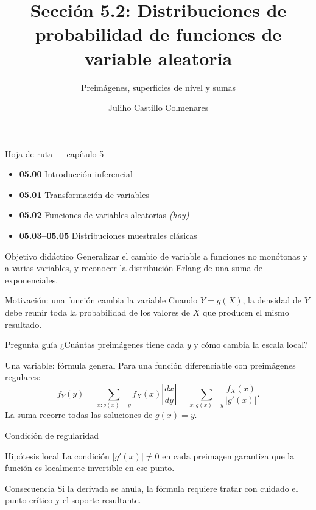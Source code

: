 \documentclass[10pt,aspectratio=169]{beamer}
\title[Distribuciones de funciones]{Sección 5.2: Distribuciones de probabilidad de funciones de variable aleatoria}
\subtitle{Preimágenes, superficies de nivel y sumas}
\author[J. Castillo Colmenares]{Juliho Castillo Colmenares}
\institute{Tecnológico de Monterrey}
\date{}
\begin{document}
\begin{frame}[plain]\vspace{-0.8cm}\titlepage\end{frame}

\begin{frame}{Hoja de ruta --- capítulo 5}
  \footnotesize
  \begin{itemize}\itemsep=0.08cm
    \item \textbf{05.00} Introducción inferencial
    \item \textbf{05.01} Transformación de variables
    \item \textbf{05.02} Funciones de variables aleatorias \emph{(hoy)}
    \item \textbf{05.03--05.05} Distribuciones muestrales clásicas
  \end{itemize}
  \begin{block}{Objetivo didáctico}
    Generalizar el cambio de variable a funciones no monótonas y a varias
    variables, y reconocer la distribución Erlang de una suma de exponenciales.
  \end{block}
\end{frame}

\begin{frame}{Motivación: una función cambia la variable}
  \footnotesize
  Cuando $Y=g(X)$, la densidad de $Y$ debe reunir toda la probabilidad de los
  valores de $X$ que producen el mismo resultado.
  \begin{alertblock}{Pregunta guía}
    ¿Cuántas preimágenes tiene cada $y$ y cómo cambia la escala local?
  \end{alertblock}
\end{frame}

\begin{frame}{Una variable: fórmula general}
  \footnotesize
  Para una función diferenciable con preimágenes regulares:
  \[
    f_Y(y)=\sum_{x:g(x)=y}f_X(x)\left|\frac{dx}{dy}\right|
    =\sum_{x:g(x)=y}\frac{f_X(x)}{|g'(x)|}.
  \]
  La suma recorre todas las soluciones de $g(x)=y$.
\end{frame}

\begin{frame}{Condición de regularidad}
  \footnotesize
  \begin{block}{Hipótesis local}
    La condición $|g'(x)|\neq0$ en cada preimagen garantiza que la función es
    localmente invertible en ese punto.
  \end{block}
  \begin{exampleblock}{Consecuencia}
    Si la derivada se anula, la fórmula requiere tratar con cuidado el punto
    crítico y el soporte resultante.
  \end{exampleblock}
\end{frame}
\end{document}
